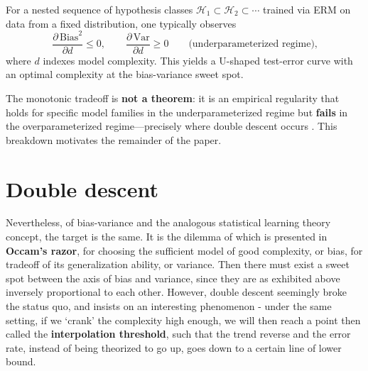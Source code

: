 \documentclass[
  journal=largetwo,
  year=2025,
  volume=37,
]{cup-journal}
\begin{document}
\begin{hypothesis}\label{thm:bias-variance}
For a nested sequence of hypothesis classes $\mathcal{H}_1\subset\mathcal{H}_2\subset\cdots$ trained via ERM on data from a fixed distribution, one typically observes
\begin{equation}
    \frac{\partial\,\mathrm{Bias}^2}{\partial d}\leq 0,\qquad
    \frac{\partial\,\mathrm{Var}}{\partial d}\geq 0
    \qquad\text{(underparameterized regime),}
\end{equation}
where $d$ indexes model complexity. This yields a U-shaped test-error curve with an optimal complexity at the bias-variance sweet spot.
\end{hypothesis}

\begin{remark}\label{rmk:bv_failure}
The monotonic tradeoff is \textbf{not a theorem}: it is an empirical regularity that holds for specific model families in the underparameterized regime but \textbf{fails} in the overparameterized regime---precisely where double descent occurs \cite{belkin_reconciling_2019,neal2019biasvariancetradeofftextbooksneed}. This breakdown motivates the remainder of the paper.
\end{remark}

\section{Double descent}\label{sec:double_descent}

Nevertheless, of bias-variance and the analogous statistical learning theory concept, the target is the same. It is the dilemma of which is presented in \textbf{Occam's razor}, for choosing the sufficient model of good complexity, or bias, for tradeoff of its generalization ability, or variance. Then there must exist a sweet spot between the axis of bias and variance, since they are as exhibited above inversely proportional to each other. However, double descent seemingly broke the status quo, and insists on an interesting phenomenon - under the same setting, if we `crank' the complexity high enough, we will then reach a point then called the \textbf{interpolation threshold}, such that the trend reverse and the error rate, instead of being theorized to go up, goes down to a certain line of lower bound. 
\end{document}
